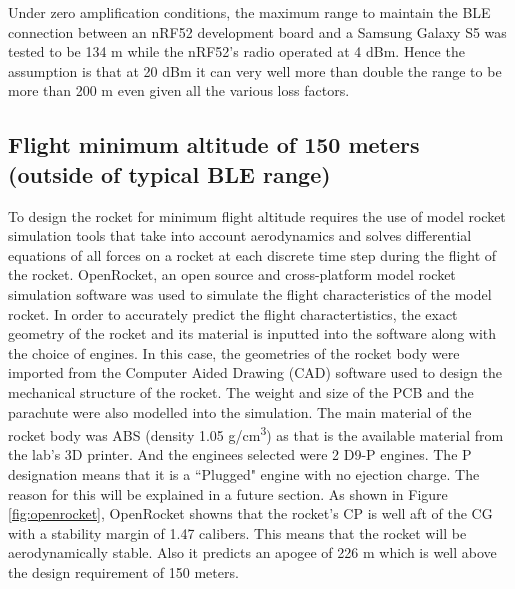 \documentclass{workreport}
\begin{document}
\begin{body}
\begin{table}
	\label{tbl:amp_table}

\end{table}

	Under zero amplification conditions, the maximum range to maintain the BLE connection between an nRF52 development board and a Samsung Galaxy S5 was tested to be 134 m while the nRF52's radio operated at 4 dBm. Hence the assumption is that at 20 dBm it can very well more than double the range to be more than 200 m even given all the various loss factors.

\subsection{Flight minimum altitude of 150 meters (outside of typical BLE range)}

	To design the rocket for minimum flight altitude requires the use of model rocket simulation tools that take into account aerodynamics and solves differential equations of all forces on a rocket at each discrete time step during the flight of the rocket. OpenRocket, an open source and cross-platform model rocket simulation software was used to simulate the flight characteristics of the model rocket. In order to accurately predict the flight charactertistics, the exact geometry of the rocket and its material is inputted into the software along with the choice of engines. In this case, the geometries of the rocket body were imported from the Computer Aided Drawing (CAD) software used to design the mechanical structure of the rocket. The weight and size of the PCB and the parachute were also modelled into the simulation. The main material of the rocket body was ABS (density 1.05 g/cm\textsuperscript{3}) as that is the available material from the lab's 3D printer. And the enginees selected were 2 D9-P engines. The P designation means that it is a ``Plugged" engine with no ejection charge. The reason for this will be explained in a future section. As shown in Figure \ref{fig:openrocket}, OpenRocket showns that the rocket's CP is well aft of the CG with a stability margin of 1.47 calibers. This means that the rocket will be aerodynamically stable. Also it predicts an apogee of 226 m which is well above the design requirement of 150 meters.


\end{body}
\end{document}

